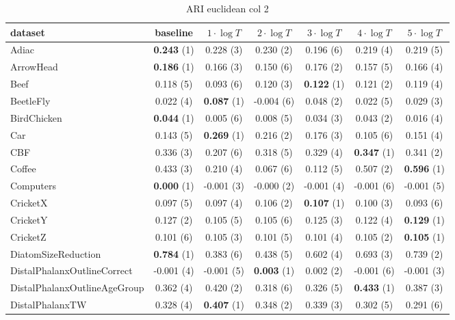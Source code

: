 \begin{table}[ht]
\caption{ARI euclidean col 2} 
\begin{adjustbox}{width=\textwidth}
\begin{tabular}{lcccccc}
\hline
dataset & baseline & \textbf{$1\cdot \log{T}$} & \textbf{$2\cdot \log{T}$} & \textbf{$3\cdot \log{T}$} & \textbf{$4\cdot \log{T}$} & \textbf{$5\cdot \log{T}$} \\ \hline
Adiac & \textbf{0.243} (1) & 0.228 (3) & 0.230 (2) & 0.196 (6) & 0.219 (4) & 0.219 (5) \\
ArrowHead & \textbf{0.186} (1) & 0.166 (3) & 0.150 (6) & 0.176 (2) & 0.157 (5) & 0.166 (4) \\
Beef & 0.118 (5) & 0.093 (6) & 0.120 (3) & \textbf{0.122} (1) & 0.121 (2) & 0.119 (4) \\
BeetleFly & 0.022 (4) & \textbf{0.087} (1) & -0.004 (6) & 0.048 (2) & 0.022 (5) & 0.029 (3) \\
BirdChicken & \textbf{0.044} (1) & 0.005 (6) & 0.008 (5) & 0.034 (3) & 0.043 (2) & 0.016 (4) \\
Car & 0.143 (5) & \textbf{0.269} (1) & 0.216 (2) & 0.176 (3) & 0.105 (6) & 0.151 (4) \\
CBF & 0.336 (3) & 0.207 (6) & 0.318 (5) & 0.329 (4) & \textbf{0.347} (1) & 0.341 (2) \\
Coffee & 0.433 (3) & 0.210 (4) & 0.067 (6) & 0.112 (5) & 0.507 (2) & \textbf{0.596} (1) \\
Computers & \textbf{0.000} (1) & -0.001 (3) & -0.000 (2) & -0.001 (4) & -0.001 (6) & -0.001 (5) \\
CricketX & 0.097 (5) & 0.097 (4) & 0.106 (2) & \textbf{0.107} (1) & 0.100 (3) & 0.093 (6) \\
CricketY & 0.127 (2) & 0.105 (5) & 0.105 (6) & 0.125 (3) & 0.122 (4) & \textbf{0.129} (1) \\
CricketZ & 0.101 (6) & 0.105 (3) & 0.101 (5) & 0.101 (4) & 0.105 (2) & \textbf{0.105} (1) \\
DiatomSizeReduction & \textbf{0.784} (1) & 0.383 (6) & 0.438 (5) & 0.602 (4) & 0.693 (3) & 0.739 (2) \\
DistalPhalanxOutlineCorrect & -0.001 (4) & -0.001 (5) & \textbf{0.003} (1) & 0.002 (2) & -0.001 (6) & -0.001 (3) \\
DistalPhalanxOutlineAgeGroup & 0.362 (4) & 0.420 (2) & 0.318 (6) & 0.326 (5) & \textbf{0.433} (1) & 0.387 (3) \\
DistalPhalanxTW & 0.328 (4) & \textbf{0.407} (1) & 0.348 (2) & 0.339 (3) & 0.302 (5) & 0.291 (6) \\

\end{tabular}
\end{adjustbox}
\end{table}
